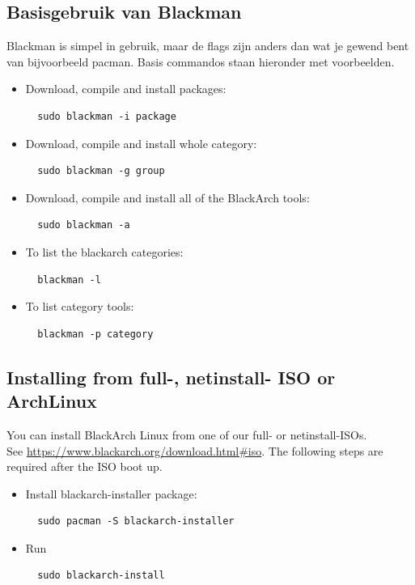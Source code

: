 \documentclass[a4paper, oneside, 11pt]{book}
\begin{document}
\subsection{Basisgebruik van Blackman} Blackman is simpel in gebruik, maar de flags zijn anders dan wat je gewend bent van bijvoorbeeld pacman. Basis commandos staan hieronder met voorbeelden.
\begin{itemize}
\item Download, compile and install packages:
\begin{lstlisting}
  sudo blackman -i package
\end{lstlisting}

\item Download, compile and install whole category:
\begin{lstlisting}
  sudo blackman -g group
\end{lstlisting}

\item Download, compile and install all of the BlackArch tools:
\begin{lstlisting}
  sudo blackman -a
\end{lstlisting}

\item To list the blackarch categories:
\begin{lstlisting}
  blackman -l
\end{lstlisting}

\item To list category tools:
\begin{lstlisting}
  blackman -p category
\end{lstlisting}

\end{itemize}

\subsection{Installing from full-, netinstall- ISO or ArchLinux}
You can install BlackArch Linux from one of our full- or netinstall-ISOs.\\See
\url{https://www.blackarch.org/download.html#iso}. The following steps are
required after the ISO boot up.
\begin{itemize}
\item Install blackarch-installer package:
\begin{lstlisting}
  sudo pacman -S blackarch-installer
\end{lstlisting}

\item Run
\begin{lstlisting}
  sudo blackarch-install
\end{lstlisting}

\end{itemize}
\end{document}
